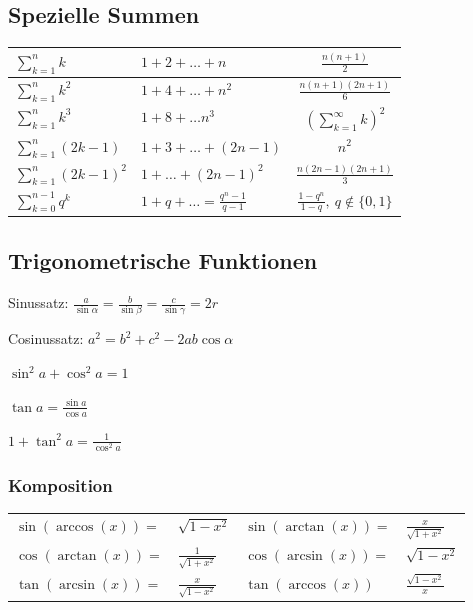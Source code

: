 \subsection{Spezielle Summen}
\begin{tabular}{l | l | c}
    $\sum_{k=1}^{n} k$ & $1 + 2 + \dots + n$ & $\frac{n(n+1)}{2}$\\\hline
    $\sum_{k=1}^{n} k^2$ & $1 + 4 + \dots + n^2$ & $\frac{n(n+1)(2n+1)}{6}$\\\hline
    $\sum_{k=1}^{n} k^3$ & $1 + 8 + \dots n^3$ & $\left( \sum_{k=1}^{\infty} k  \right)^2$\\\hline
    $\sum_{k=1}^{n} (2k - 1)$ & $1 + 3 + \dots + (2n -1)$ & $n^2$\\\hline
    $\sum_{k=1}^{n} (2k - 1)^2$ & $1 + \dots + (2n - 1)^2$ & $\frac{n(2n-1)(2n+1)}{3}$\\\hline
    $\sum_{k=0}^{n-1} q^k$ & $1 + q + \dots = \frac{q^n-1}{q-1}$ & $\frac{1 - q^n}{1-q}, \ q \not\in \{0, 1\}$\\\hline
\end{tabular}

\subsection{Trigonometrische Funktionen}
\begin{compactdesc}
    \item[Sinussatz:] $\frac{a}{\sin \alpha} = \frac{b}{\sin \beta} = \frac{c}{\sin \gamma} = 2r$
    \item[Cosinussatz:] $a^2 = b^2 + c^2 - 2ab \cos \alpha$
\end{compactdesc}
\begin{compactitem}
    \item $\sin^2a + \cos^2a = 1$
    \item $\tan a = \frac{\sin a}{\cos a}$
    \item $1 + \tan^2 a = \frac{1}{\cos^2 a}$
\end{compactitem}

\subsubsection{Komposition}
\begin{tabular}{l l | l l}
    $\sin(\arccos(x)) =$ & $\sqrt{1 - x^2}$ & $\sin(\arctan(x))=$ & $\frac{x}{\sqrt{1 + x^2} }$\\
    $\cos(\arctan(x)) =$ & $\frac{1}{\sqrt{ 1 + x^2}}$ & $\cos(\arcsin(x))=$ & $\sqrt{1 - x^2}$\\
    $\tan(\arcsin(x)) =$ & $\frac{x}{\sqrt{1 - x^2}}$ & $\tan(\arccos(x))$ & $\frac{\sqrt{1 - x^2}}{x}$\\
\end{tabular}

